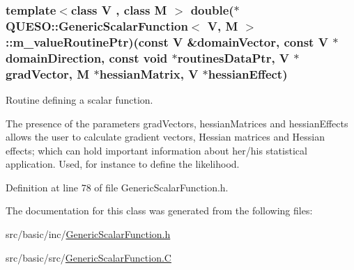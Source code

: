 \hypertarget{class_q_u_e_s_o_1_1_generic_scalar_function_a9feaa5ee6ceb321fde56c5dd4dc48f2f}{
\subsubsection[{m\-\_\-value\-Routine\-Ptr}]{\setlength{\rightskip}{0pt plus 5cm}template$<$class V , class M $>$ double($\ast$ {\bf Q\-U\-E\-S\-O\-::\-Generic\-Scalar\-Function}$<$ V, M $>$\-::m\-\_\-value\-Routine\-Ptr)(const V \&domain\-Vector, const V $\ast$domain\-Direction, const void $\ast$routines\-Data\-Ptr, V $\ast$grad\-Vector, M $\ast$hessian\-Matrix, V $\ast$hessian\-Effect)\hspace{0.3cm}{\ttfamily [protected]}}}\label{class_q_u_e_s_o_1_1_generic_scalar_function_a9feaa5ee6ceb321fde56c5dd4dc48f2f}


Routine defining a scalar function. 

The presence of the parameters {\ttfamily grad\-Vectors}, {\ttfamily hessian\-Matrices} and {\ttfamily hessian\-Effects} allows the user to calculate gradient vectors, Hessian matrices and Hessian effects; which can hold important information about her/his statistical application. Used, for instance to define the likelihood. 

Definition at line 78 of file Generic\-Scalar\-Function.\-h.



The documentation for this class was generated from the following files\-:\begin{DoxyCompactItemize}
\item 
src/basic/inc/\hyperlink{_generic_scalar_function_8h}{Generic\-Scalar\-Function.\-h}\item 
src/basic/src/\hyperlink{_generic_scalar_function_8_c}{Generic\-Scalar\-Function.\-C}\end{DoxyCompactItemize}
